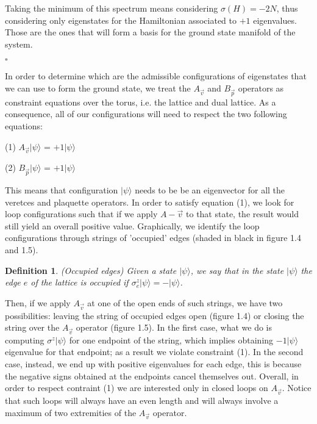 \documentclass{Configuration_Files/PoliMi3i_thesis}
\newtheorem{definition}{Definition}[chapter]
\begin{document}
Taking the minimum of this spectrum means considering $\sigma(H)=-2N$, thus considering only eigenstates for the Hamiltonian associated to $+1$ eigenvalues.
Those are the ones that will form a basis for the ground state manifold of the system.\newline

\hfill $\square$


In order to determine which are the admissible configurations of eigenstates that we can use to form the ground state, we treat the $A_{\vec{v}} $ and $B_{\vec{p}} $ operators as constraint equations over the torus, i.e. the lattice and dual lattice.
As a consequence, all of our configurations will need to respect the two following equations:

\begin{center}
	(1)	$A_{\vec{v}} |\psi\rangle$ = $+1|\psi\rangle$
\end{center}

\begin{center}
	(2)	$B_{\vec{p}} |\psi\rangle$ = $+1|\psi\rangle$
\end{center}

This means that configuration $|\psi\rangle$ needs to be be an eigenvector for all the veretces and plaquette operators. \newline
In order to satisfy equation (1), we look for loop configurations such that if we apply $A-{\vec{v}} $ to that state, the result would still yield an overall positive value.\newline
Graphically, we identify the loop configurations through strings of 'occupied' edges (shaded in black in figure 1.4 and 1.5).

\begin{definition}(Occupied edges)
	Given a state $|\psi\rangle $, we say that in the state $|\psi\rangle $ the edge $e$ of the lattice is occupied if $\sigma^z_e |\psi\rangle  = - |\psi\rangle $.
\end{definition}

Then, if we apply $A_{\vec{v}} $ at one of the open ends of such strings, we have two possibilities: leaving the string of occupied edges open (figure 1.4) or closing the string over the $A_{\vec{v}} $ operator (figure 1.5).
In the first case, what we do is computing $\sigma^{z} |\psi\rangle$ for one endpoint of the string, which implies obtaining $-1|\psi\rangle$ eigenvalue for that endpoint; as a result we violate constraint (1). In the second case, instead, we end up with positive eigenvalues for each edge, this is because the negative signs obtained at the endpoints cancel themselves out. Overall, in order to respect contraint (1) we are interested only in closed loops on $A_{\vec{v}} $. Notice that such loops will always have an even length and will always involve a maximum of two extremities of the $A_{\vec{v}} $ operator.{\cite{Her20}}
\end{document}

